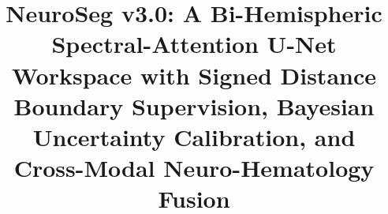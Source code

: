 \documentclass[conference]{IEEEtran}
\begin{document}
\title{NeuroSeg v3.0: A Bi-Hemispheric Spectral-Attention U-Net Workspace with Signed Distance Boundary Supervision, Bayesian Uncertainty Calibration, and Cross-Modal Neuro-Hematology Fusion}

\author{
}

\maketitle

\begin{abstract}

\end{abstract}
\end{document}
